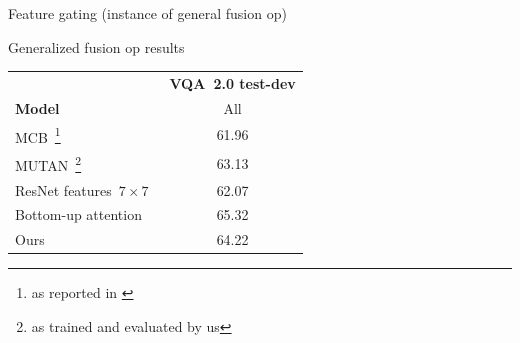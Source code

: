 \documentclass{beamer}
\begin{document}
{%
\begin{frame}{Feature gating (instance of general fusion op)}
\centering
\hspace*{-1.0cm}
\scalebox{0.7}{%

}
\end{frame}
}

{%
\begin{frame}{Generalized fusion op results}
\centering
\begin{minipage}{\linewidth}
\begin{tabular}{lc}
& \textbf{VQA~2.0 test-dev} \\
\textbf{Model} & All \\
\midrule
MCB~\cite{DBLP:conf/emnlp/FukuiPYRDR16}\footnote{as reported in \cite{goyal2017making}} & 61.96 \\
MUTAN~\cite{ben2017mutan}\footnote{as trained and evaluated by us} & 63.13 \\
ResNet features~$7 \times 7$~\cite{teney2017tips} & 62.07 \\
Bottom-up attention~\cite{teney2017tips} & 65.32 \\
\midrule
Ours & 64.22 \\
\midrule
\end{tabular}
\end{minipage}
\end{frame}
}






\end{document}
